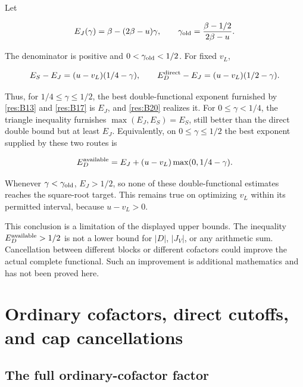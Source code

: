 \documentclass[11pt]{article}
\numberwithin{equation}{section}
\begin{document}
Let

\begin{equation}\label{res:B21}
E_J(\gamma)=\beta-(2\beta-u)\gamma,\qquad
 \gamma_{\rm old}=\frac{\beta-1/2}{2\beta-u}.
\end{equation}

The denominator is positive and \(0<\gamma_{\rm old}<1/2\). For fixed
\(v_L\),

\begin{equation}\label{res:B22}
E_S-E_J=(u-v_L)(1/4-\gamma),\qquad
 E_D^{\rm direct}-E_J=(u-v_L)(1/2-\gamma).
\end{equation}

Thus, for \(1/4\leq\gamma\leq1/2\), the best double-functional exponent
furnished by \eqref{res:B13} and \eqref{res:B17} is \(E_J\), and
\eqref{res:B20} realizes it. For \(0\leq\gamma<1/4\), the triangle
inequality furnishes \(\max(E_J,E_S)=E_S\), still better than the direct
double bound but at least \(E_J\). Equivalently, on
\(0\leq\gamma\leq1/2\) the best exponent supplied by these two routes is

\begin{equation}\label{res:B23}
E_D^{\rm available}
 =E_J+(u-v_L)\max(0,1/4-\gamma).
\end{equation}

Whenever \(\gamma<\gamma_{\rm old}\), \(E_J>1/2\), so none of these
double-functional estimates reaches the square-root target. This remains
true on optimizing \(v_L\) within its permitted interval, because
\(u-v_L>0\).

This conclusion is a limitation of the displayed upper bounds. The
inequality \(E_D^{\rm available}>1/2\) is not a lower bound for \(|D|\),
\(|J_V|\), or any arithmetic sum. Cancellation between different blocks
or different cofactors could improve the actual complete functional.
Such an improvement is additional mathematics and has not been proved
here.

\section{Ordinary cofactors, direct cutoffs, and cap
cancellations}\label{ordinary-cofactors-direct-cutoffs-and-cap-cancellations}

\subsection{The full ordinary-cofactor
factor}\label{the-full-ordinary-cofactor-factor}
\end{document}
